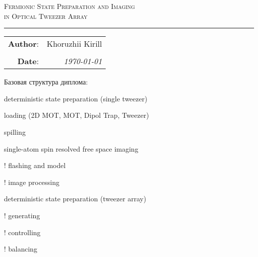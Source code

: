 
\begin{center}
    \LARGE \textsc{Fermionic State Preparation and Imaging \\ in Optical Tweezer Array}
\end{center}

\hrule

\phantom{42}

\begin{flushright}
    \begin{tabular}{rr}
        \textbf{Author}: 
        & Khoruzhii Kirill \\
        & \\
        \textbf{Date}: &
        \textit{\today}\\
    \end{tabular}
\end{flushright}

\thispagestyle{empty}

\tableofcontents

\vfill

Базовая структура диплома:
\begin{enumerate*}
    \item deterministic state preparation (single tweezer)
    \begin{enumerate*}
        \item loading (2D MOT, MOT, Dipol Trap, Tweezer)
        \item spilling
    \end{enumerate*}
    \item single-atom spin resolved free space imaging
    \begin{enumerate*}
        \item ! flashing and model
        \item ! image processing
    \end{enumerate*}
    \item deterministic state preparation (tweezer array)
    \begin{enumerate*}
        \item ! generating
        \item ! controlling
        \item ! balancing
    \end{enumerate*}
\end{enumerate*}


\newpage
